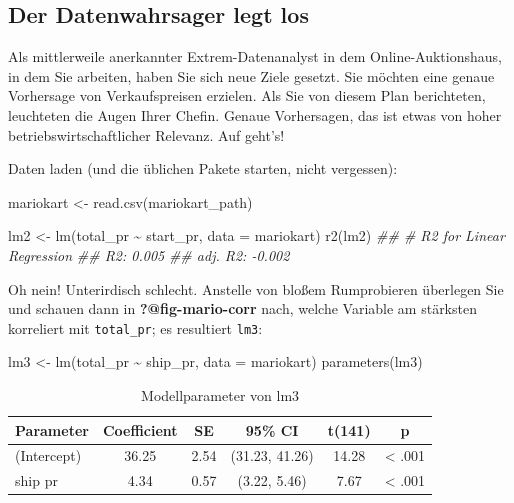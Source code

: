 \documentclass[
  a4paper,
]{scrbook}
\newenvironment{Shaded}{\begin{snugshade}}{\end{snugshade}}
\newcommand{\AttributeTok}[1]{\textcolor[rgb]{0.40,0.45,0.13}{#1}}
\newcommand{\DocumentationTok}[1]{\textcolor[rgb]{0.37,0.37,0.37}{\textit{#1}}}
\newcommand{\FunctionTok}[1]{\textcolor[rgb]{0.28,0.35,0.67}{#1}}
\newcommand{\NormalTok}[1]{\textcolor[rgb]{0.00,0.23,0.31}{#1}}
\newcommand{\OtherTok}[1]{\textcolor[rgb]{0.00,0.23,0.31}{#1}}
\newcommand{\SpecialCharTok}[1]{\textcolor[rgb]{0.37,0.37,0.37}{#1}}
\theoremstyle{definition}
\theoremstyle{definition}
\theoremstyle{definition}
\theoremstyle{remark}
\begin{document}
\subsection{Der Datenwahrsager legt
los}\label{der-datenwahrsager-legt-los}

Als mittlerweile anerkannter Extrem-Datenanalyst in dem
Online-Auktionshaus, in dem Sie arbeiten, haben Sie sich neue Ziele
gesetzt. Sie möchten eine genaue Vorhersage von Verkaufspreisen
erzielen. Als Sie von diesem Plan berichteten, leuchteten die Augen
Ihrer Chefin. Genaue Vorhersagen, das ist etwas von hoher
betriebswirtschaftlicher Relevanz. Auf geht's!

Daten laden (und die üblichen Pakete starten, nicht vergessen):

\begin{Shaded}
\begin{Highlighting}[]
\NormalTok{mariokart }\OtherTok{\textless{}{-}} \FunctionTok{read.csv}\NormalTok{(mariokart\_path)}
\end{Highlighting}
\end{Shaded}

\begin{Shaded}
\begin{Highlighting}[]
\NormalTok{lm2 }\OtherTok{\textless{}{-}} \FunctionTok{lm}\NormalTok{(total\_pr }\SpecialCharTok{\textasciitilde{}}\NormalTok{ start\_pr, }\AttributeTok{data =}\NormalTok{ mariokart)}
\FunctionTok{r2}\NormalTok{(lm2)}
\DocumentationTok{\#\# \# R2 for Linear Regression}
\DocumentationTok{\#\#        R2: 0.005}
\DocumentationTok{\#\#   adj. R2: {-}0.002}
\end{Highlighting}
\end{Shaded}

Oh nein! Unterirdisch schlecht. Anstelle von bloßem Rumprobieren
überlegen Sie und schauen dann in \textbf{?@fig-mario-corr} nach, welche
Variable am stärksten korreliert mit \texttt{total\_pr}; es resultiert
\texttt{lm3}:

\begin{Shaded}
\begin{Highlighting}[]
\NormalTok{lm3 }\OtherTok{\textless{}{-}} \FunctionTok{lm}\NormalTok{(total\_pr }\SpecialCharTok{\textasciitilde{}}\NormalTok{ ship\_pr, }\AttributeTok{data =}\NormalTok{ mariokart)}
\FunctionTok{parameters}\NormalTok{(lm3)}
\end{Highlighting}
\end{Shaded}

\begin{longtable}[]{@{}lccccc@{}}

\caption{\label{tbl-lm3}Modellparameter von lm3}

\tabularnewline

\toprule\noalign{}
Parameter & Coefficient & SE & 95\% CI & t(141) & p \\
\midrule\noalign{}
\endhead
\bottomrule\noalign{}
\endlastfoot
(Intercept) & 36.25 & 2.54 & (31.23, 41.26) & 14.28 & \textless{}
.001 \\
ship pr & 4.34 & 0.57 & (3.22, 5.46) & 7.67 & \textless{} .001 \\

\end{longtable}
\end{document}

